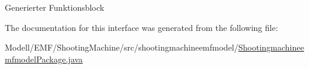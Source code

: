 Generierter Funktionsblock 

The documentation for this interface was generated from the following file\-:\begin{DoxyCompactItemize}
\item 
Modell/\-E\-M\-F/\-Shooting\-Machine/src/shootingmachineemfmodel/\hyperlink{_shootingmachineemfmodel_package_8java}{Shootingmachineemfmodel\-Package.\-java}\end{DoxyCompactItemize}
